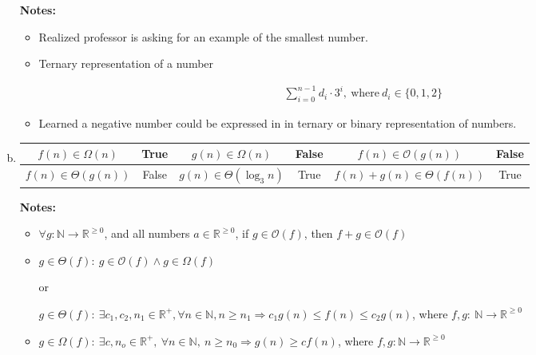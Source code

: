 \documentclass[12pt]{article}
\begin{document}
\begin{enumerate}[a.]
    \bigskip

    \textbf{Notes:}

    \begin{itemize}
        \item Realized professor is asking for an example of the smallest number.
        \item Ternary representation of a number

        \begin{align*}
            \sum\limits_{i=0}^{n-1} d_i \cdot 3^i,\:\text{where}\:d_i \in \{0,1,2\}
        \end{align*}

        \item Learned a negative number could be expressed in in ternary or binary
        representation of numbers.
    \end{itemize}

    \item

    \begin{tabular}{|c|c|c|c|c|c|}
        \hline
        $f(n) \in \Omega(n)$ & True & $g(n) \in \Omega(n)$ & False & $f(n) \in \mathcal{O}(g(n))$ & False\\
        \hline
        $f(n) \in \Theta(g(n))$ & False & $g(n) \in \Theta(\log_3 n)$ & True & $f(n) + g(n) \in \Theta(f(n))$ & True\\
        \hline
    \end{tabular}

    \bigskip

    \textbf{Notes:}

    \begin{itemize}
        \item

        $\forall g:\mathbb{N} \to \mathbb{R}^{\geq 0}$, and all numbers $a \in \mathbb{R}^{\geq 0}$,
        if $g \in \mathcal{O}(f)$, then $f + g \in \mathcal{O}(f)$

        \item
        $g \in \Theta(f):\: g \in \mathcal{O}(f) \land g \in \Omega(f)$

        or

        $g \in \Theta(f):\:\exists c_1,c_2,n_1 \in \mathbb{R}^{+}, \forall n \in \mathbb{N}, n \geq n_1
        \Rightarrow c_1g(n) \leq f(n) \leq c_2g(n)$, where $f,g:\:\mathbb{N} \to \mathbb{R}^{\geq 0}$

        \item
        $g \in \Omega(f):\:\exists c,n_o \in \mathbb{R}^{+},\:\forall n \in
        \mathbb{N},\:n \geq n_0 \Rightarrow g(n) \geq cf(n)$, where $f,g:\mathbb{N} \to \mathbb{R}^{\geq 0}$


\end{itemize}
\end{enumerate}
\end{document}
